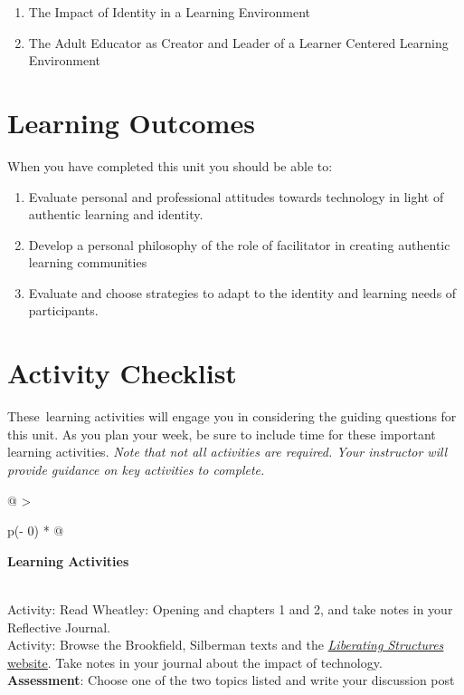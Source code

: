 \documentclass[
]{book}
\providecommand{\tightlist}{%
  \setlength{\itemsep}{0pt}\setlength{\parskip}{0pt}}
\begin{document}
\begin{enumerate}
\def\labelenumi{\arabic{enumi}.}
\tightlist
\item
  The Impact of Identity in a Learning Environment
\item
  The Adult Educator as Creator and Leader of a Learner Centered Learning Environment
\end{enumerate}

\hypertarget{learning-outcomes-5}{%
\section*{Learning Outcomes}\label{learning-outcomes-5}}

When you have completed this unit you should be able to:

\begin{enumerate}
\def\labelenumi{\arabic{enumi}.}
\tightlist
\item
  Evaluate personal and professional attitudes towards technology in light of authentic learning and identity.
\item
  Develop a personal philosophy of the role of facilitator in creating authentic learning communities
\item
  Evaluate and choose strategies to adapt to the identity and learning needs of participants.
\end{enumerate}

\hypertarget{activity-checklist-5}{%
\section*{Activity Checklist}\label{activity-checklist-5}}

These~learning activities will engage you in considering the guiding questions for this unit. As you plan your week, be sure to include time for these important learning activities. \emph{Note that not all activities are required. Your instructor will provide guidance on key activities to complete.}

\begin{longtable}[]{@{}
  >{\raggedright\arraybackslash}p{(\columnwidth - 0\tabcolsep) * }@{}}
\toprule
\begin{minipage}[b]{\linewidth}\raggedright
\textbf{Learning Activities}
\end{minipage} \\
\midrule
\endhead
Activity: Read Wheatley: Opening and chapters 1 and 2, and take notes in your Reflective Journal. \\
Activity: Browse the Brookfield, Silberman texts and the \href{http://www.liberatingstructures.com/ls-menu/}{\emph{Liberating Structures} website}. Take notes in your journal about the impact of technology. \\
\textbf{Assessment}: Choose one of the two topics listed and write your discussion post \\
\bottomrule
\end{longtable}
\end{document}
